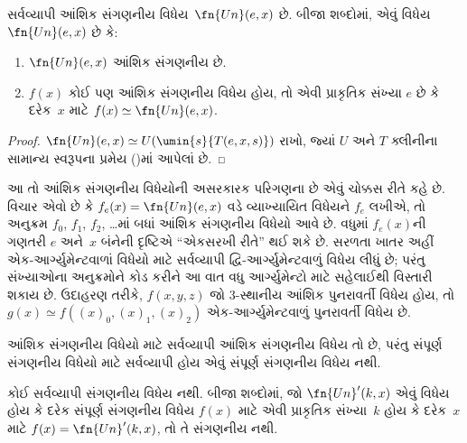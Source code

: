 \begingroup
\makeatletter{}\makeatother

\label{guunit:OLP-0233}


\begin{thm}
સર્વવ્યાપી આંશિક સંગણનીય વિધેય~$\fn{Un}(e,x)$ છે. બીજા શબ્દોમાં,
એવું વિધેય $\fn{Un}(e,x)$ છે કે:
\begin{enumerate}
\item $\fn{Un}(e,x)$ આંશિક સંગણનીય છે.
\item $f(x)$ કોઈ પણ આંશિક સંગણનીય વિધેય હોય, તો એવી
પ્રાકૃતિક સંખ્યા $e$ છે કે દરેક~$x$ માટે $f(x) \simeq \fn{Un}(e,x)$.
\end{enumerate}
\end{thm}

\begin{proof}
$\fn{Un}(e,x) \simeq U(\umin{s}{T(e,x,s)})$ રાખો, જ્યાં $U$ અને $T$
ક્લીનીના સામાન્ય સ્વરૂપના પ્રમેય ()માં
આપેલાં છે.
\end{proof}

\begin{explain}
આ તો આંશિક સંગણનીય વિધેયોની અસરકારક પરિગણના છે એવું ચોક્કસ રીતે
કહે છે. વિચાર એવો છે કે $f_e(x) = \fn{Un}(e,x)$ વડે વ્યાખ્યાયિત
વિધેયને $f_e$ લખીએ, તો અનુક્રમ $f_0$, $f_1$, $f_2$, \dots માં બધાં
આંશિક સંગણનીય વિધેયો આવે છે. વધુમાં $f_e(x)$ની ગણતરી $e$ અને~$x$
બંનેની દૃષ્ટિએ ``એકસરખી રીતે'' થઈ શકે છે. સરળતા ખાતર અહીં એક-આર્ગ્યુમેન્ટવાળાં
વિધેયો માટે સર્વવ્યાપી દ્વિ-આર્ગ્યુમેન્ટવાળું વિધેય લીધું છે; પરંતુ
સંખ્યાઓના અનુક્રમોને કોડ કરીને આ વાત વધુ આર્ગ્યુમેન્ટો માટે સહેલાઈથી
વિસ્તારી શકાય છે. ઉદાહરણ તરીકે, $f(x,y,z)$ જો $3$-સ્થાનીય આંશિક
પુનરાવર્તી વિધેય હોય, તો $g(x) \simeq f((x)_0, (x)_1, (x)_2)$
એક-આર્ગ્યુમેન્ટવાળું પુનરાવર્તી વિધેય છે.
\end{explain}
\endgroup


\begingroup
\makeatletter{}\makeatother

\label{guunit:OLP-0234}


આંશિક સંગણનીય વિધેયો માટે સર્વવ્યાપી આંશિક સંગણનીય વિધેય તો છે,
પરંતુ સંપૂર્ણ સંગણનીય વિધેયો માટે સર્વવ્યાપી હોય એવું સંપૂર્ણ
સંગણનીય વિધેય નથી.

\begin{thm}
કોઈ સર્વવ્યાપી સંગણનીય વિધેય નથી. બીજા શબ્દોમાં, જો
$\fn{Un}'(k, x)$ એવું વિધેય હોય કે દરેક સંપૂર્ણ સંગણનીય વિધેય
$f(x)$ માટે એવી પ્રાકૃતિક સંખ્યા~$k$ હોય કે દરેક~$x$ માટે
$f(x) = \fn{Un}'(k,x)$, તો તે સંગણનીય નથી.
\end{thm}

